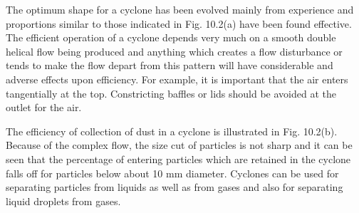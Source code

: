 \begin{frame}
	The optimum shape for a cyclone has been evolved mainly from experience and proportions similar to those indicated in Fig. 10.2(a) have been found effective. The efficient operation of a cyclone depends very much on a smooth double helical flow being produced and anything which creates a flow disturbance or tends to make the flow depart from this pattern will have considerable and adverse effects upon efficiency. For example, it is important that the air enters tangentially at the top. Constricting baffles or lids should be avoided at the outlet for the air.

	The efficiency of collection of dust in a cyclone is illustrated in Fig. 10.2(b). Because of the complex flow, the size cut of particles is not sharp and it can be seen that the percentage of entering particles which are retained in the cyclone falls off for particles below about 10 mm diameter. Cyclones can be used for separating particles from liquids as well as from gases and also for separating liquid droplets from gases.
\end{frame}

